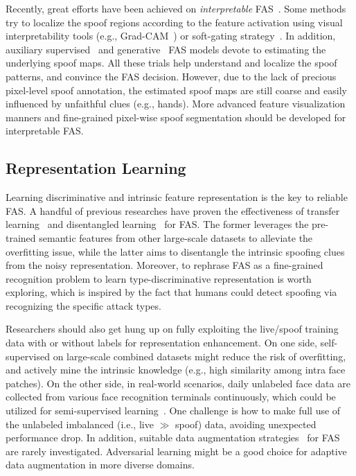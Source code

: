 \documentclass[10pt,journal,compsoc]{IEEEtran}
\begin{document}
Recently, great efforts have been achieved on \textit{interpretable} FAS~\cite{sequeiraexploratory}. Some methods try to localize the spoof regions according to the feature activation using visual interpretability tools (e.g., Grad-CAM~\cite{selvaraju2017grad}) or soft-gating strategy~\cite{deb2020look}. In addition, auxiliary supervised~\cite{Liu2018Learning,yu2020face} and generative~\cite{jourabloo2018face,liu2020physics} FAS models devote to estimating the underlying spoof maps. All these trials help understand and localize the spoof patterns, and convince the FAS decision. However, due to the lack of precious pixel-level spoof annotation, the estimated spoof maps are still coarse and easily influenced by unfaithful clues (e.g., hands). More advanced feature visualization manners and fine-grained pixel-wise spoof segmentation should be developed for interpretable FAS.  


\vspace{-0.8em}
\subsection{Representation Learning}
Learning discriminative and intrinsic feature representation is the key to reliable FAS. A handful of previous researches have proven the effectiveness of transfer learning~\cite{lucena2017transfer,parkin2019recognizing} and disentangled learning~\cite{zhang2020face,liu2020physics} for FAS. The former leverages the pre-trained semantic features from other large-scale datasets to alleviate the overfitting issue, while the latter aims to disentangle the intrinsic spoofing clues from the noisy representation. Moreover, to rephrase FAS as a fine-grained recognition problem to learn type-discriminative representation is worth exploring, which is inspired by the fact that humans could detect spoofing via recognizing the specific attack types.  

Researchers should also get hung up on fully exploiting the live/spoof training data with or without labels for representation enhancement. On one side, self-supervised on large-scale combined datasets might reduce the risk of overfitting, and actively mine the intrinsic knowledge (e.g., high similarity among intra face patches). On the other side, in real-world scenarios, daily unlabeled face data are collected from various face recognition terminals continuously, which could be utilized for semi-supervised learning~\cite{quan2021progressive}. One challenge is how to make full use of the unlabeled imbalanced (i.e., live $\gg$ spoof) data, avoiding unexpected performance drop. In addition, suitable data augmentation strategies~\cite{yu2021dual} for FAS are rarely investigated. Adversarial learning might be a good choice for adaptive data augmentation in more diverse domains.        
\end{document}
